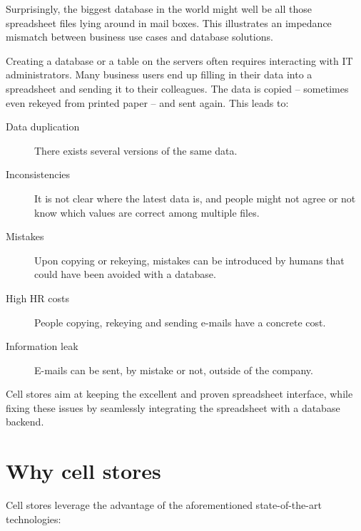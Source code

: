 \documentclass{acm_proc_article-sp}
\begin{document}
Surprisingly, the biggest database in the world might well be all those spreadsheet files lying around in mail boxes. This illustrates an impedance mismatch between business use cases and database solutions.

Creating a database or a table on the servers often requires interacting with IT administrators. Many business users end up filling in their data into a spreadsheet and sending it to their colleagues. The data is copied -- sometimes even rekeyed from printed paper -- and sent again. This leads to:

\begin{description}
\item[Data duplication] There exists several versions of the same data.
\item [Inconsistencies] It is not clear where the latest data is, and people might not agree or not know which values are correct among multiple files.
\item[Mistakes] Upon copying or rekeying, mistakes can be introduced by humans that could have been avoided with a database.
\item[High HR costs] People copying, rekeying and sending e-mails have a concrete cost.
\item[Information leak] E-mails can be sent, by mistake or not, outside of the company.
\end{description}

Cell stores aim at keeping the excellent and proven spreadsheet interface, while fixing these issues by seamlessly integrating the spreadsheet with a database backend.

\section{Why cell stores}
\label{section-why}

Cell stores leverage the advantage of the aforementioned state-of-the-art technologies:
\end{document}
